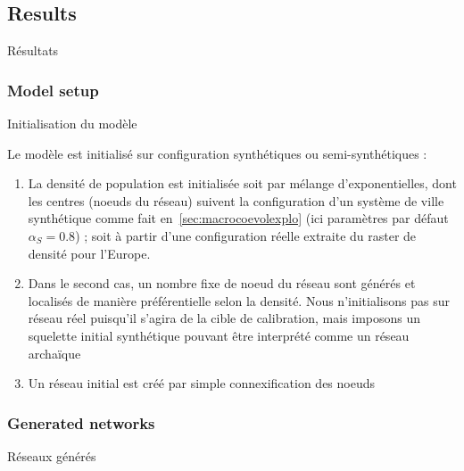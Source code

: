 





\subsection{Results}{Résultats}


\subsubsection{Model setup}{Initialisation du modèle}

Le modèle est initialisé sur configuration synthétiques ou semi-synthétiques :
\begin{enumerate}
	\item La densité de population est initialisée soit par mélange d'exponentielles, dont les centres (noeuds du réseau) suivent la configuration d'un système de ville synthétique comme fait en~\ref{sec:macrocoevolexplo} (ici paramètres par défaut $\alpha_S = 0.8$) ; soit à partir d'une configuration réelle extraite du raster de densité pour l'Europe. 
	\item Dans le second cas, un nombre fixe de noeud du réseau sont générés et localisés de manière préférentielle selon la densité. Nous n'initialisons pas sur réseau réel puisqu'il s'agira de la cible de calibration, mais imposons un squelette initial synthétique pouvant être interprété comme un réseau archaïque
	\item Un réseau initial est créé par simple connexification des noeuds
\end{enumerate}

\subsubsection{Generated networks}{Réseaux générés}

